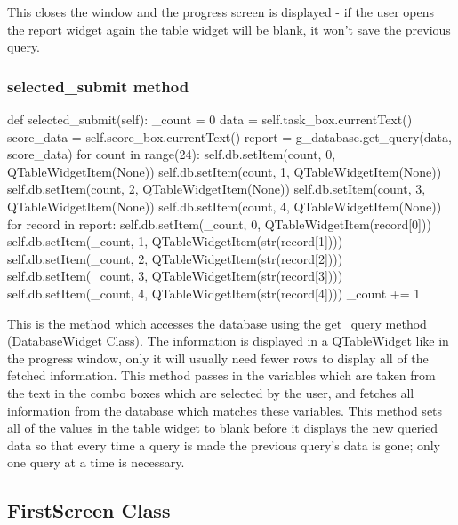 This closes the window and the progress screen is displayed - if the user opens the report widget again the table widget will be blank, it won't save the previous query.

\subsubsection{selected\_submit method}

\begin{python}
def selected_submit(self):
        _count = 0
        data = self.task_box.currentText()
        score_data = self.score_box.currentText()
        report = g_database.get_query(data, score_data)
        for count in range(24):
            self.db.setItem(count, 0, QTableWidgetItem(None))
            self.db.setItem(count, 1, QTableWidgetItem(None))
            self.db.setItem(count, 2, QTableWidgetItem(None))
            self.db.setItem(count, 3, QTableWidgetItem(None))
            self.db.setItem(count, 4, QTableWidgetItem(None))
        for record in report:
            self.db.setItem(_count, 0, QTableWidgetItem(record[0]))
            self.db.setItem(_count, 1, QTableWidgetItem(str(record[1])))
            self.db.setItem(_count, 2, QTableWidgetItem(str(record[2])))
            self.db.setItem(_count, 3, QTableWidgetItem(str(record[3])))
            self.db.setItem(_count, 4, QTableWidgetItem(str(record[4])))
            _count += 1
\end{python}

This is the method which accesses the database using the get\_query method (DatabaseWidget Class). The information is displayed in a QTableWidget like in the progress window, only it will usually need fewer rows to display all of the fetched information. This method passes in the variables which are taken from the text in the combo boxes which are selected by the user, and fetches all information from the database which matches these variables. This method sets all of the values in the table widget to blank before it displays the new queried data so that every time a query is made the previous query's data is gone; only one query at a time is necessary.

\subsection{FirstScreen Class}

